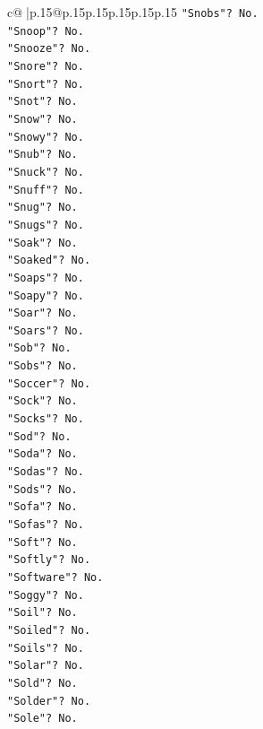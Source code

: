 \documentclass{article}
\begin{document}
{\begin{supertabular}{c@{$\;$}|p{.15\linewidth}@{}p{.15\linewidth}p{.15\linewidth}p{.15\linewidth}p{.15\linewidth}p{.15\linewidth}}
{{{\texttt{"Snobs"? No.} \\
\texttt{"Snoop"? No.} \\
\texttt{"Snooze"? No.} \\
\texttt{"Snore"? No.} \\
\texttt{"Snort"? No.} \\
\texttt{"Snot"? No.} \\
\texttt{"Snow"? No.} \\
\texttt{"Snowy"? No.} \\
\texttt{"Snub"? No.} \\
\texttt{"Snuck"? No.} \\
\texttt{"Snuff"? No.} \\
\texttt{"Snug"? No.} \\
\texttt{"Snugs"? No.} \\
\texttt{"Soak"? No.} \\
\texttt{"Soaked"? No.} \\
\texttt{"Soaps"? No.} \\
\texttt{"Soapy"? No.} \\
\texttt{"Soar"? No.} \\
\texttt{"Soars"? No.} \\
\texttt{"Sob"? No.} \\
\texttt{"Sobs"? No.} \\
\texttt{"Soccer"? No.} \\
\texttt{"Sock"? No.} \\
\texttt{"Socks"? No.} \\
\texttt{"Sod"? No.} \\
\texttt{"Soda"? No.} \\
\texttt{"Sodas"? No.} \\
\texttt{"Sods"? No.} \\
\texttt{"Sofa"? No.} \\
\texttt{"Sofas"? No.} \\
\texttt{"Soft"? No.} \\
\texttt{"Softly"? No.} \\
\texttt{"Software"? No.} \\
\texttt{"Soggy"? No.} \\
\texttt{"Soil"? No.} \\
\texttt{"Soiled"? No.} \\
\texttt{"Soils"? No.} \\
\texttt{"Solar"? No.} \\
\texttt{"Sold"? No.} \\
\texttt{"Solder"? No.} \\
\texttt{"Sole"? No.} \\
}}}
\end{supertabular}}
\end{document}
